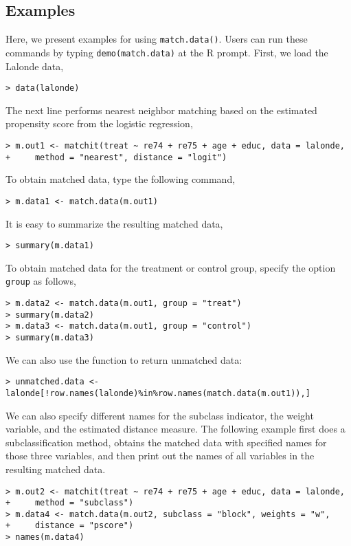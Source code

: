 \subsection{Examples}

Here, we present examples for using {\tt match.data()}. Users can run
these commands by typing {\tt demo(match.data)} at the R
prompt. First, we load the Lalonde data,

\begin{verbatim}
> data(lalonde)
\end{verbatim}

The next line performs nearest neighbor matching based on the
estimated propensity score from the logistic regression,

\begin{verbatim}
> m.out1 <- matchit(treat ~ re74 + re75 + age + educ, data = lalonde, 
+     method = "nearest", distance = "logit")
\end{verbatim}

To obtain matched data, type the following command, 

\begin{verbatim}
> m.data1 <- match.data(m.out1)
\end{verbatim}

It is easy to summarize the resulting matched data,

\begin{verbatim}
> summary(m.data1)
\end{verbatim}

To obtain matched data for the treatment or control group, specify the option
{\tt group} as follows,

\begin{verbatim}
> m.data2 <- match.data(m.out1, group = "treat")
> summary(m.data2)
> m.data3 <- match.data(m.out1, group = "control")
> summary(m.data3)
\end{verbatim}

We can also use the function to return unmatched data:

\begin{verbatim}
> unmatched.data <- lalonde[!row.names(lalonde)%in%row.names(match.data(m.out1)),]
\end{verbatim}

We can also specify different names for the subclass indicator, the
weight variable, and the estimated distance measure. The following
example first does a subclassification method, obtains the
matched data with specified names for those three variables, and then
print out the names of all variables in the resulting matched data.

\begin{verbatim}
> m.out2 <- matchit(treat ~ re74 + re75 + age + educ, data = lalonde, 
+     method = "subclass")
> m.data4 <- match.data(m.out2, subclass = "block", weights = "w", 
+     distance = "pscore")
> names(m.data4)
\end{verbatim}

